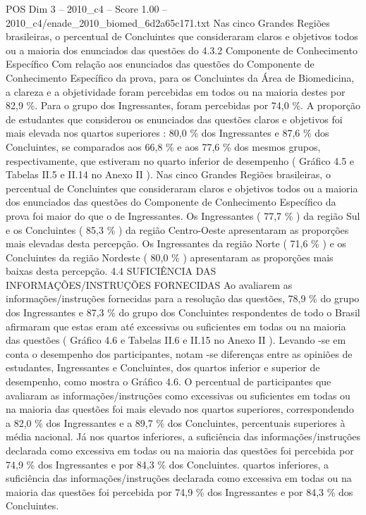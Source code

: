 \begin{textsample}{POS Dim 3 – 2010\_c4 – Score 1.00 – 2010\_c4/enade\_2010\_biomed\_6d2a65c171.txt}
Nas cinco Grandes Regiões brasileiras, o percentual de Concluintes que consideraram claros e objetivos todos ou a maioria dos enunciados das questões do 4.3.2 Componente de Conhecimento Específico Com relação aos enunciados das questões do Componente de Conhecimento Específico da prova, para os Concluintes da Área de Biomedicina, a clareza e a objetividade foram percebidas em todos ou na maioria destes por 82,9 \%.
Para o grupo dos Ingressantes, foram percebidas por 74,0 \%.
A proporção de estudantes que considerou os enunciados das questões claros e objetivos foi mais elevada nos quartos superiores : 80,0 \% dos Ingressantes e 87,6 \% dos Concluintes, se comparados aos 66,8 \% e aos 77,6 \% dos mesmos grupos, respectivamente, que estiveram no quarto inferior de desempenho ( Gráfico 4.5 e Tabelas II.5 e II.14 no Anexo II ).
Nas cinco Grandes Regiões brasileiras, o percentual de Concluintes que consideraram claros e objetivos todos ou a maioria dos enunciados das questões do Componente de Conhecimento Específico da prova foi maior do que o de Ingressantes.
Os Ingressantes ( 77,7 \% ) da região Sul e os Concluintes ( 85,3 \% ) da região Centro-Oeste apresentaram as proporções mais elevadas desta percepção.
Os Ingressantes da região Norte ( 71,6 \% ) e os Concluintes da região Nordeste ( 80,0 \% ) apresentaram as proporções mais baixas desta percepção. 4.4 SUFICIÊNCIA DAS INFORMAÇÕES/INSTRUÇÕES FORNECIDAS Ao avaliarem as informações/instruções fornecidas para a resolução das questões, 78,9 \% do grupo dos Ingressantes e 87,3 \% do grupo dos Concluintes respondentes de todo o Brasil afirmaram que estas eram até excessivas ou suficientes em todas ou na maioria das questões ( Gráfico 4.6 e Tabelas II.6 e II.15 no Anexo II ).
Levando -se em conta o desempenho dos participantes, notam -se diferenças entre as opiniões de estudantes, Ingressantes e Concluintes, dos quartos inferior e superior de desempenho, como mostra o Gráfico 4.6.
O percentual de participantes que avaliaram as informações/instruções como excessivas ou suficientes em todas ou na maioria das questões foi mais elevado nos quartos superiores, correspondendo a 82,0 \% dos Ingressantes e a 89,7 \% dos Concluintes, percentuais superiores à média nacional.
Já nos quartos inferiores, a suficiência das informações/instruções declarada como excessiva em todas ou na maioria das questões foi percebida por 74,9 \% dos Ingressantes e por 84,3 \% dos Concluintes. quartos inferiores, a suficiência das informações/instruções declarada como excessiva em todas ou na maioria das questões foi percebida por 74,9 \% dos Ingressantes e por 84,3 \% dos Concluintes.

\end{textsample}
